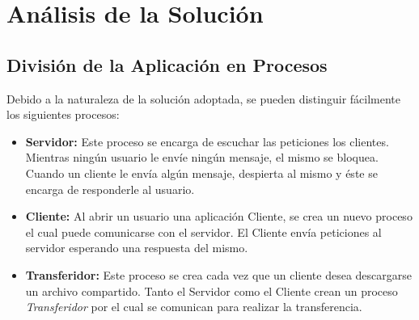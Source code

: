 \documentclass[a4paper,10pt]{article}
\begin{document}
	\section{An\'alisis de la Soluci\'on}
		\subsection{Divisi\'on de la Aplicaci\'on en Procesos}
			Debido a la naturaleza de la soluci\'on adoptada, se pueden distinguir f\'acilmente los siguientes procesos:

			\begin{itemize}
				\item \textbf{Servidor:} Este proceso se encarga de escuchar las peticiones los clientes. Mientras ning\'un usuario le env\'ie ning\'un 
				mensaje, el mismo se bloquea. Cuando un cliente le env\'ia alg\'un mensaje, despierta al mismo y \'este se encarga de responderle al 
				usuario.
				\item \textbf{Cliente:} Al abrir un usuario una aplicaci\'on Cliente, se crea un nuevo proceso el cual puede comunicarse con el servidor.
				El Cliente env\'ia peticiones al servidor esperando una respuesta del mismo.
				\item \textbf{Transferidor:} Este proceso se crea cada vez que un cliente desea descargarse un archivo compartido. Tanto el Servidor como
				el Cliente crean un proceso \emph{Transferidor} por el cual se comunican para realizar la transferencia.
			\end{itemize}
\end{document}
